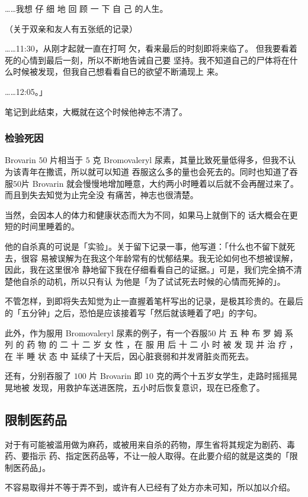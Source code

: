 \documentclass[UTF8]{ctexart}
\begin{document}
……我想 仔 细 地 回 顾 一 下 自 己 的人生。

（关于双亲和友人有五张纸的记录）

……11:30，从刚才起就一直在打呵 欠，看来最后的时刻即将来临了。
但我要看着死的心情到最后一刻，所以不断地告诫自己要 坚持。我不知道自己的尸体将在什么时候被发现，但我自己想看看自已的欲望不断涌现上 来。

……12:05。」

笔记到此结束，大概就在这个时候他神志不清了。

\subsubsection*{检验死因}

Brovarin $50$ 片相当于 $5$ 克 Bromovaleryl 尿素，其量比致死量低得多，但我不认为该青年在撒谎，所以就可以知道 吞服这么多的量也会死去的。同时也知道了吞服$50$片 Brovarin
就会慢慢地增加睡意，大约两小时睡着以后就不会再醒过来了。而且到失去知觉为止完全没
有痛苦，神志也很清楚。

当然，会因本人的体力和健康状态而大为不同，如果马上就倒下的
话大概会在更短的时间里睡着的。

他的自杀真的可说是「实验」。关于留下记录一事，他写道：「什么也不留下就死去，很容 易被误解为在我这个年龄常有的忧郁结果。我无论如何也不想被误解，因此，我在这里很冷 静地留下我在仔细看看自己的证据。」可是，我们完全搞不清楚他自杀的动机，所以只有认 为他是「为了试试死去时候的心情而死掉的」。

不管怎样，到即将失去知觉为止一直握着笔杆写出的记录，是极其珍贵的。在最后的「五分钟」之后，恐怕是应该接着写「然后就该睡着了吧」的字句。

此外，作为服用 Bromovaleryl 尿素的例子，有一个吞服$50$ 片 五 种 布 罗 姆 系 列 的 药 物 的 二 十 二 岁 女 性 ，在 服 用 后 十 二 小 时 被 发 现 并 治 疗 ，在 半 睡 状 态 中 延续了十天后，因心脏衰弱和并发肾脏炎而死去。

还有，分别吞服了 $100$ 片 Brovarin 即 $10$ 克的两个十五岁女学生，走路时摇摇晃晃地被
发现，用救护车送进医院，五小时后恢复意识，现在已痊愈了。

\subsection{限制医药品}

对于有可能被滥用做为麻药，或被用来自杀的药物，厚生省将其规定为剧药、毒药、要指示
药、指定医药品等，不让一般人取得。在此要介绍的就是这类的「限制医药品」。

不容易取得并不等于弄不到，或许有人已经有了处方亦未可知，所以加以介绍。
\end{document}

